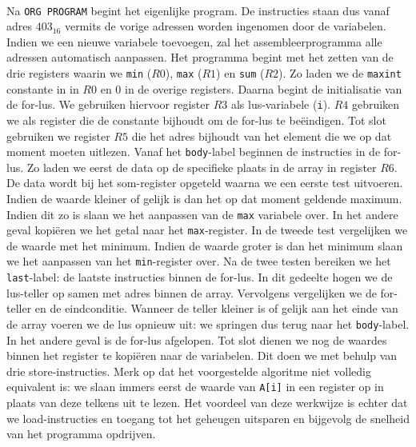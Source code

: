 \paragraph{}
Na \verb+ORG PROGRAM+ begint het eigenlijke program. De instructies staan dus vanaf adres $403_{16}$ vermits de vorige adressen worden ingenomen door de variabelen. Indien we een nieuwe variabele toevoegen, zal het assembleerprogramma alle adressen automatisch aanpassen. Het programma begint met het zetten van de drie registers waarin we \verb+min+ ($R0$), \verb+max+ ($R1$) en \verb+sum+ ($R2$). Zo laden we de \verb+maxint+ constante in in $R0$ en $0$ in de overige registers. Daarna begint de initialisatie van de for-lus. We gebruiken hiervoor register $R3$ als lus-variabele (\verb+i+). $R4$ gebruiken we als register die de constante bijhoudt om de for-lus te be\"eindigen. Tot slot gebruiken we register $R5$ die het adres bijhoudt van het element die we op dat moment moeten uitlezen. Vanaf het \verb+body+-label beginnen de instructies in de for-lus. Zo laden we eerst de data op de specifieke plaats in de array in register $R6$. De data wordt bij het som-register opgeteld waarna we een eerste test uitvoeren. Indien de waarde kleiner of gelijk is dan het op dat moment geldende maximum. Indien dit zo is slaan we het aanpassen van de \verb+max+ variabele over. In het andere geval kopi\"eren we het getal naar het \verb+max+-register. In de tweede test vergelijken we de waarde met het minimum. Indien de waarde groter is dan het minimum slaan we het aanpassen van het \verb+min+-register over. Na de twee testen bereiken we het \verb+last+-label: de laatste instructies binnen de for-lus. In dit gedeelte hogen we de lus-teller op samen met adres binnen de array. Vervolgens vergelijken we de for-teller en de eindconditie. Wanneer de teller kleiner is of gelijk aan het einde van de array voeren we de lus opnieuw uit: we springen dus terug naar het \verb+body+-label. In het andere geval is de for-lus afgelopen. Tot slot dienen we nog de waardes binnen het register te kopi\"eren naar de variabelen. Dit doen we met behulp van drie store-instructies. Merk op dat het voorgestelde algoritme niet volledig equivalent is: we slaan immers eerst de waarde van \verb+A[i]+ in een register op in plaats van deze telkens uit te lezen. Het voordeel van deze werkwijze is echter dat we load-instructies en toegang tot het geheugen uitsparen en bijgevolg de snelheid van het programma opdrijven.

